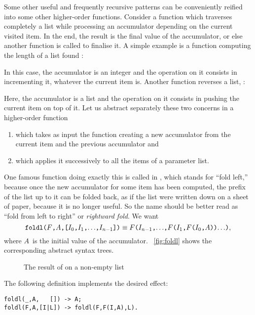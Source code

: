 Some other useful and frequently recursive patterns can be
conveniently reified into some other higher\hyp{}order
functions. Consider a function which traverses completely a list while
processing an accumulator depending on the current visited item. In
the end, the result is the final value of the accumulator, or else
another function is called to finalise it. A simple example is a
function computing the length of a list found :

In this case, the accumulator is an integer and the operation on it
consists in incrementing it, whatever the current item is. Another
function reverses a list, :
 
Here, the accumulator is a list and the operation on it consists in
pushing the current item on top of it. Let us abstract separately
these two concerns in a higher\hyp{}order function
\begin{enumerate}

  \item which takes as input the function creating a new accumulator
    from the current item and the previous accumulator and

  \item which applies it successively to all the items of a parameter
    list.

\end{enumerate}
One famous function doing exactly this is called  in
\Erlang, which stands for ``fold left,'' because once the new
accumulator for some item has been computed, the prefix of the list up
to it can be folded back, as if the list were written down on a sheet
of paper, because it is no longer useful. So the name should be better
read as ``fold from left to right'' or \emph{rightward fold}. We want
\[
\texttt{foldl(\(F\),\(A\),[\(I_0\),\(I_1\),\(\ldots\),\(I_{n-1}\)])}
\mathrel{\equiv}
\texttt{\(F\)(\(I_{n-1}\),\(\ldots\),\(F\)(\(I_1\),\(F\)(\(I_0\),\(A\)))\(\ldots\))},
\]
where \(A\)~is the initial value of the
accumulator. \Fig~\vref{fig:foldl} shows the corresponding abstract
syntax trees.
\begin{figure}
\centering
{}
\qquad
{}
\caption{The result of  on a non\hyp{}empty list
\label{fig:foldl}}
\end{figure}
The following definition implements the desired effect:
\begin{verbatim}
foldl(_,A,   []) -> A;
foldl(F,A,[I|L]) -> foldl(F,F(I,A),L).
\end{verbatim}
